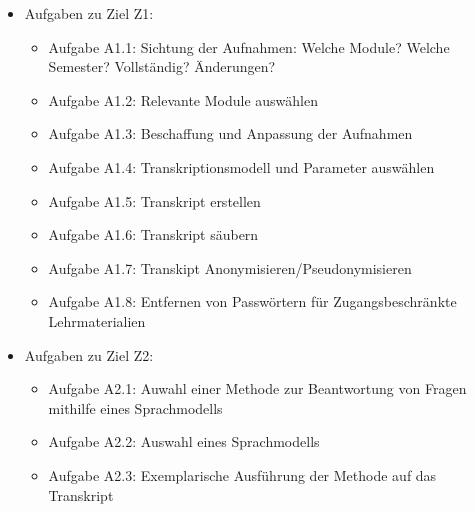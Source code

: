 \begin{itemize}
\item Aufgaben zu Ziel Z1:
	\begin{itemize}
	\item Aufgabe A1.1: Sichtung der Aufnahmen: Welche Module? Welche Semester? Vollständig? Änderungen?
	\item Aufgabe A1.2: Relevante Module auswählen
	\item Aufgabe A1.3: Beschaffung und Anpassung der Aufnahmen
	\item Aufgabe A1.4: Transkriptionsmodell und Parameter auswählen
	\item Aufgabe A1.5: Transkript erstellen
	\item Aufgabe A1.6: Transkript säubern
	\item Aufgabe A1.7: Transkipt Anonymisieren/Pseudonymisieren
        \item Aufgabe A1.8: Entfernen von Passwörtern für Zugangsbeschränkte Lehrmaterialien
	\end{itemize}
\item Aufgaben zu Ziel Z2:
	\begin{itemize}
	\item Aufgabe A2.1: Auwahl einer Methode zur Beantwortung von Fragen mithilfe eines Sprachmodells 
	\item Aufgabe A2.2: Auswahl eines Sprachmodells
	\item Aufgabe A2.3: Exemplarische Ausführung der Methode auf das Transkript
	\end{itemize}
\end{itemize}
